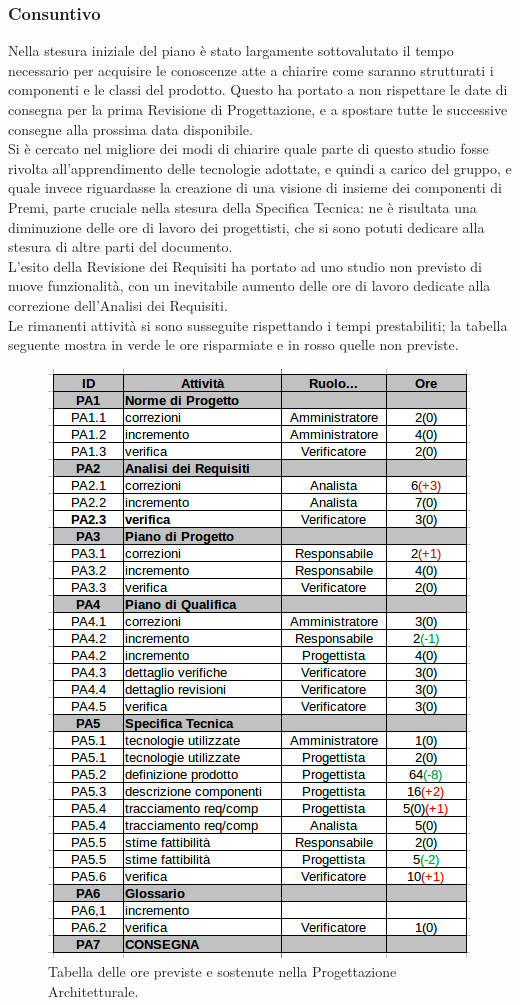 \subsubsection{Consuntivo}
Nella stesura iniziale del piano è stato largamente sottovalutato il tempo necessario per acquisire le conoscenze atte a chiarire come saranno strutturati i componenti e le classi del prodotto. Questo ha portato a non rispettare le date di consegna per la prima Revisione di Progettazione, e a spostare tutte le successive consegne alla prossima data disponibile. \\
Si è cercato nel migliore dei modi di chiarire quale parte di questo studio fosse rivolta all'apprendimento delle tecnologie adottate, e quindi a carico del gruppo, e quale invece riguardasse la creazione di una visione di insieme dei componenti di Premi, parte cruciale nella stesura della Specifica Tecnica: ne è risultata una diminuzione delle ore di lavoro dei progettisti, che si sono potuti dedicare alla stesura di altre parti del documento. \\
L'esito della Revisione dei Requisiti ha portato ad uno studio non previsto di nuove funzionalità, con un inevitabile aumento delle ore di lavoro dedicate alla correzione dell'Analisi dei Requisiti. \\
Le rimanenti attività si sono susseguite rispettando i tempi prestabiliti; la tabella seguente mostra in verde le ore risparmiate e in rosso quelle non previste. \\

\begin{figure}[h]
\begin{center}
\includegraphics[scale=0.45]{img/consuntivo-progarc.png}
\caption{Tabella delle ore previste e sostenute nella Progettazione Architetturale.}
\end{center}
\end{figure}
\clearpage

